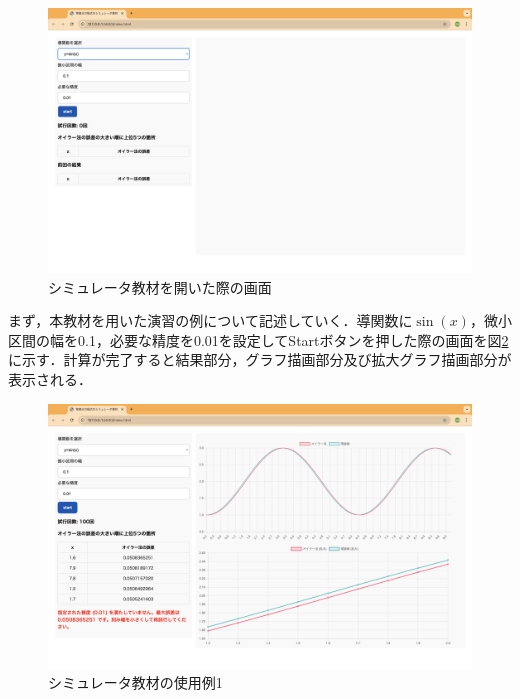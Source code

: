 \documentclass[a4paper, 12pt]{ltjsarticle}
\begin{document}
\begin{figure}[h]
\begin{center}
\includegraphics[clip,width=\textwidth,keepaspectratio]{sim-sample1.png}
\end{center}
\caption{シミュレータ教材を開いた際の画面}
\label{fig:シミュレータ教材を開いた際の画面}
\end{figure}

\clearpage

まず，本教材を用いた演習の例について記述していく．導関数に$\sin(x)$，微小区間の幅を0.1，必要な精度を0.01を設定してStartボタンを押した際の画面を図\ref{fig:シミュレータ教材の使用例1}に示す．計算が完了すると結果部分，グラフ描画部分及び拡大グラフ描画部分が表示される．

\begin{figure}[h]
\begin{center}
\includegraphics[clip,width=\textwidth,keepaspectratio]{sim-sample2.png}
\end{center}
\caption{シミュレータ教材の使用例1}
\label{fig:シミュレータ教材の使用例1}
\end{figure}
\end{document}
